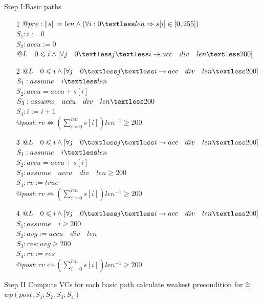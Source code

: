 \documentclass[]{article}
\begin{document}
	Step I:Basic paths
	\begin{itemize}
		\item [1] $@pre : \|s\|=len \wedge (\forall i:0  \textless len \Rightarrow s[i]\in[0,255]) $\\
		$S_1:i:=0$\\
		$S_2:accu:=0$\\
		$@L\quad0 \leqslant i \wedge [\forall j \quad0 \textless j \textless i \rightarrow acc\quad div\quad len \textless 200]$
		\item [2]  $@L\quad0 \leqslant i \wedge [\forall j \quad0 \textless j \textless i \rightarrow acc\quad div\quad len \textless 200]$\\
		$S_1:assume\quad i \textless len$\\
		$S_2:accu=accu+s[i]$\\
		$S_3:assume\quad accu \quad div \quad len \textless 200 $\\
		$S_4:i:=i+1$\\
		$@post : rv \Leftrightarrow (\sum_{i=0}^{len} s[i])len^{-1} \geqslant 200$\\
		\item [3] $@L\quad0 \leqslant i \wedge [\forall j \quad0 \textless j \textless i \rightarrow acc\quad div\quad len \textless 200]$\\
		$S_1:assume \quad i \textless len$\\
		$S_2:accu=accu+s[i]$\\
		$S_3:assume\quad accu \quad div \quad len \geqslant 200$\\
		$S_4:rv:=true$\\
		$@post : rv \Leftrightarrow (\sum_{i=0}^{len} s[i])len^{-1} \geqslant 200$\\
		\item[4] $@L\quad0 \leqslant i \wedge [\forall j \quad0 \textless j \textless i \rightarrow acc\quad div\quad len \textless 200]$\\
		$S_1:assume\quad i \geqslant 200$\\
		$S_2:avg:=accu \quad div \quad len$\\
		$S_3:res:avg \geqslant200$\\
		$S_4:rv:=res$\\
		$@post : rv \Leftrightarrow (\sum_{i=0}^{len} s[i])len^{-1} \geqslant 200$\\
	\end{itemize}
	Step II Compute VCs for each basic path
	calculate weakest precondition for 2:\\
	$wp(post,S_1;S_2;S_3;S_4)$\\
\end{document}
